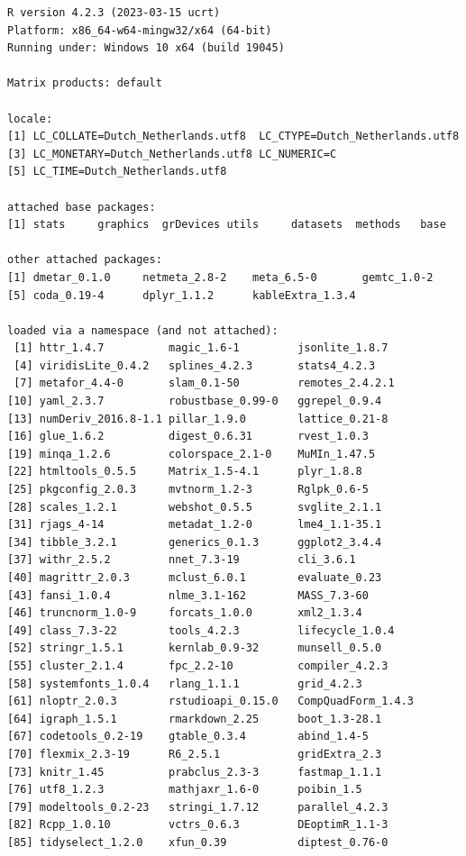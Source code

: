 \documentclass[
  letterpaper,
  DIV=11,
  numbers=noendperiod]{scrreprt}
\begin{document}
\begin{verbatim}
R version 4.2.3 (2023-03-15 ucrt)
Platform: x86_64-w64-mingw32/x64 (64-bit)
Running under: Windows 10 x64 (build 19045)

Matrix products: default

locale:
[1] LC_COLLATE=Dutch_Netherlands.utf8  LC_CTYPE=Dutch_Netherlands.utf8   
[3] LC_MONETARY=Dutch_Netherlands.utf8 LC_NUMERIC=C                      
[5] LC_TIME=Dutch_Netherlands.utf8    

attached base packages:
[1] stats     graphics  grDevices utils     datasets  methods   base     

other attached packages:
[1] dmetar_0.1.0     netmeta_2.8-2    meta_6.5-0       gemtc_1.0-2     
[5] coda_0.19-4      dplyr_1.1.2      kableExtra_1.3.4

loaded via a namespace (and not attached):
 [1] httr_1.4.7          magic_1.6-1         jsonlite_1.8.7     
 [4] viridisLite_0.4.2   splines_4.2.3       stats4_4.2.3       
 [7] metafor_4.4-0       slam_0.1-50         remotes_2.4.2.1    
[10] yaml_2.3.7          robustbase_0.99-0   ggrepel_0.9.4      
[13] numDeriv_2016.8-1.1 pillar_1.9.0        lattice_0.21-8     
[16] glue_1.6.2          digest_0.6.31       rvest_1.0.3        
[19] minqa_1.2.6         colorspace_2.1-0    MuMIn_1.47.5       
[22] htmltools_0.5.5     Matrix_1.5-4.1      plyr_1.8.8         
[25] pkgconfig_2.0.3     mvtnorm_1.2-3       Rglpk_0.6-5        
[28] scales_1.2.1        webshot_0.5.5       svglite_2.1.1      
[31] rjags_4-14          metadat_1.2-0       lme4_1.1-35.1      
[34] tibble_3.2.1        generics_0.1.3      ggplot2_3.4.4      
[37] withr_2.5.2         nnet_7.3-19         cli_3.6.1          
[40] magrittr_2.0.3      mclust_6.0.1        evaluate_0.23      
[43] fansi_1.0.4         nlme_3.1-162        MASS_7.3-60        
[46] truncnorm_1.0-9     forcats_1.0.0       xml2_1.3.4         
[49] class_7.3-22        tools_4.2.3         lifecycle_1.0.4    
[52] stringr_1.5.1       kernlab_0.9-32      munsell_0.5.0      
[55] cluster_2.1.4       fpc_2.2-10          compiler_4.2.3     
[58] systemfonts_1.0.4   rlang_1.1.1         grid_4.2.3         
[61] nloptr_2.0.3        rstudioapi_0.15.0   CompQuadForm_1.4.3 
[64] igraph_1.5.1        rmarkdown_2.25      boot_1.3-28.1      
[67] codetools_0.2-19    gtable_0.3.4        abind_1.4-5        
[70] flexmix_2.3-19      R6_2.5.1            gridExtra_2.3      
[73] knitr_1.45          prabclus_2.3-3      fastmap_1.1.1      
[76] utf8_1.2.3          mathjaxr_1.6-0      poibin_1.5         
[79] modeltools_0.2-23   stringi_1.7.12      parallel_4.2.3     
[82] Rcpp_1.0.10         vctrs_0.6.3         DEoptimR_1.1-3     
[85] tidyselect_1.2.0    xfun_0.39           diptest_0.76-0     
\end{verbatim}
\end{document}
